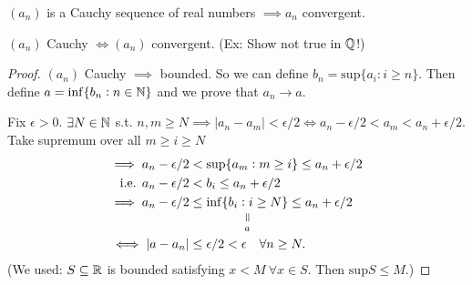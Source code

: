 \begin{theorem}
$(a_n)$ is a Cauchy sequence of real numbers $\implies a_n$ convergent. 
\end{theorem}

\begin{corollary}
$(a_n)$ Cauchy $\iff (a_n)$ convergent. (Ex: Show not true in $\mathbb{Q}$!) 	
\end{corollary}

\begin{proof}
$(a_n)$ Cauchy $\implies$ bounded. So we can define $b_n = \mathrm{sup}\{a_i : i \geq n\}$. Then define $a = \mathrm{inf}\{b_n : n \in\mathbb{N}\}$ and we prove that $a_n \to a$.

Fix $\epsilon > 0$. $\exists N \in\mathbb{N}$ s.t. $n,m \geq N  \implies |a_n - a_m| < \epsilon/2 \iff a_n - \epsilon/2 < a_m < a_n + \epsilon /2$.
Take supremum over all $m \geq i \geq N$
\[\begin{aligned}
\implies a_n - \epsilon/2 &< \mathrm{sup}	\{a_m: m \geq i\} \leq a_n + \epsilon/2\\
\text{ i.e. } a_n - \epsilon/2 &< b_i \leq a_n + \epsilon/2\\
\implies a_n - \epsilon/2 &\leq \equalto{\mathrm{inf}	\{b_i: i \geq N\}}{a} \leq a_n + \epsilon/2\\
\iff |a-a_n| &\leq \epsilon/2 < \epsilon \quad \forall n \geq N.\end{aligned}\]
(We used: $S \subseteq \mathbb{R}$ is bounded satisfying $x < M~\forall x \in S$. Then $\mathrm{sup}S \leq M$.)
\end{proof}

\pagebreak
{}

